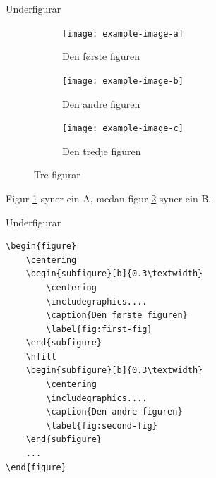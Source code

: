 \begin{frame}[containsverbatim]{Underfigurar}
	
	\begin{figure}
		\centering
		\begin{subfigure}[b]{0.3\textwidth}
			\centering
			\texttt{[image: example-image-a]}
			\caption{Den første figuren}
			\label{fig:first-fig}
		\end{subfigure}
		\hfill
		\begin{subfigure}[b]{0.3\textwidth}
			\centering
			\texttt{[image: example-image-b]}
			\caption{Den andre figuren}
			\label{fig:second-fig}
		\end{subfigure}
		\hfill
		\begin{subfigure}[b]{0.3\textwidth}
			\centering
			\texttt{[image: example-image-c]}
			\caption{Den tredje figuren}
			\label{fig:third-fig}
		\end{subfigure}
		\caption{Tre figurar}
		\label{fig:three-figures}
	\end{figure}
	
	Figur \ref{fig:first-fig} syner ein A, medan figur \ref{fig:second-fig} syner ein B.
	
\end{frame}


\begin{frame}[containsverbatim]{Underfigurar}
	
	\begin{verbatim}
\begin{figure}
	\centering
	\begin{subfigure}[b]{0.3\textwidth}
		\centering
		\includegraphics....
		\caption{Den første figuren}
		\label{fig:first-fig}
	\end{subfigure}
	\hfill
	\begin{subfigure}[b]{0.3\textwidth}
		\centering
		\includegraphics....
		\caption{Den andre figuren}
		\label{fig:second-fig}
	\end{subfigure}
	...
\end{figure}
	\end{verbatim}
	
	
	
	
\end{frame}


